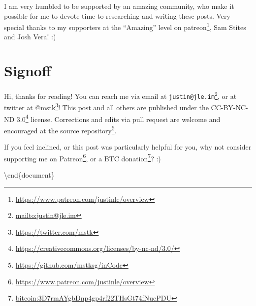 \documentclass[]{article}
\renewcommand{\href}[2]{#2\footnote{\url{#1}}}
\begin{document}
I am very humbled to be supported by an amazing community, who make it possible
for me to devote time to researching and writing these posts. Very special
thanks to my supporters at the ``Amazing'' level on
\href{https://www.patreon.com/justinle/overview}{patreon}, Sam Stites and Josh
Vera! :)

\section{Signoff}\label{signoff}

Hi, thanks for reading! You can reach me via email at
\href{mailto:justin@jle.im}{\nolinkurl{justin@jle.im}}, or at twitter at
\href{https://twitter.com/mstk}{@mstk}! This post and all others are published
under the \href{https://creativecommons.org/licenses/by-nc-nd/3.0/}{CC-BY-NC-ND
3.0} license. Corrections and edits via pull request are welcome and encouraged
at \href{https://github.com/mstksg/inCode}{the source repository}.

If you feel inclined, or this post was particularly helpful for you, why not
consider \href{https://www.patreon.com/justinle/overview}{supporting me on
Patreon}, or a \href{bitcoin:3D7rmAYgbDnp4gp4rf22THsGt74fNucPDU}{BTC donation}?
:)

\textbackslash end\{document\}
\end{document}
